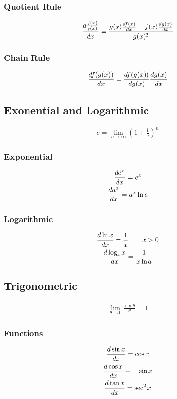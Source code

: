 \documentclass[12pt]{article}
\begin{document}
			\subsubsection{Quotient Rule}
				\begin{gather}
					\deriv{\frac{f(x)}{g(x)}} =
					\frac{g(x)\deriv{f(x)} -
					f(x)\deriv{g(x)}}{g(x)^2}
				\end{gather}
			\subsubsection{Chain Rule}
				\begin{gather}
					\deriv{f(g(x))} =
					\deriv[g(x)]{f(g(x))}\deriv{g(x)}
				\end{gather}
		\subsection{Exonential and Logarithmic}
			\begin{gather}
				e = \lim_{n \to \infty} \left(1 +
				\frac{1}{n}\right)^n
			\end{gather}
			\subsubsection{Exponential}
				\begin{gather}
					\deriv{e^x} = e^x \\
					\deriv{a^x} = a^x\ln a
				\end{gather}
			\subsubsection{Logarithmic}
				\begin{gather}
					\deriv{\ln x} = \frac{1}{x} \qquad x > 0 \\
					\deriv{\log_ax} = \frac{1}{x\ln a}
				\end{gather}
		\subsection{Trigonometric}
			\begin{gather}
				\lim_{\theta \to 0} \frac{\sin \theta}{\theta} =
				1
			\end{gather}
			\subsubsection{Functions}
				\begin{gather}
					\deriv{\sin x} = \cos x \\
					\deriv{\cos x} = -\sin x \\
					\deriv{\tan x} = \sec^2 x
				\end{gather}
\end{document}

